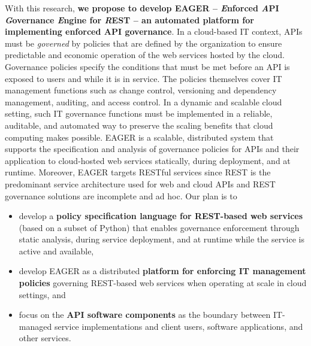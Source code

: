 \documentclass[10pt]{article}
\begin{document}
With this research, {\bf we propose to develop EAGER -- {\em E}nforced {\em
A}PI {\em G}overnance {\em E}ngine for {\em R}EST -- 
an automated platform for
implementing enforced
API governance}.  In a cloud-based IT context, APIs must be {\em governed} by
policies that are defined by the organization to ensure predictable and
economic operation of the web services hosted by the cloud.  
Governance policies specify the conditions that must be met before 
an API is exposed to users and while it is in service.
The policies themselves cover IT management functions such as change
control, versioning and dependency management, auditing, and access control.
In a dynamic and scalable cloud setting, such IT governance functions must be 
implemented
in a reliable, auditable, and automated way to preserve the scaling benefits
that cloud computing makes possible.  EAGER
is a scalable, distributed system that supports the specification 
and analysis of
governance policies for APIs and their application to cloud-hosted
web services statically, during deployment, and at runtime.
Moreover, EAGER targets RESTful services since REST is 
the predominant service architecture used for web 
and cloud APIs and REST governance solutions are incomplete and ad hoc. 
Our plan is to
\begin{itemize}
\item develop a {\bf policy specification language for REST-based web
services} (based on a subset of Python) that
enables governance enforcement through static analysis, during service
deployment, and at runtime while the service is active and available,
\item develop EAGER as a distributed {\bf platform for enforcing IT 
management policies} governing
REST-based web services when operating at scale in cloud settings, and
\item focus on the {\bf API software components} as the boundary between 
IT-managed
service implementations and client users, software applications, and other
services.
\end{itemize}
\end{document}
